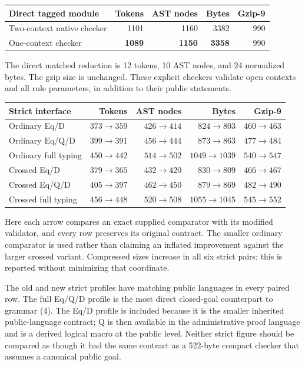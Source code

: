 \documentclass[11pt,letterpaper]{article}
\theoremstyle{definition}\newtheorem{definition}[theorem]{Definition}
\theoremstyle{remark}\newtheorem{remark}[theorem]{Remark}
\begin{document}
\begin{center}
\small
\begin{tabular}{@{}lrrrr@{}}
\toprule
Direct tagged module & Tokens & AST nodes & Bytes & Gzip-9\\
\midrule
Two-context native checker & 1101 & 1160 & 3382 & 990\\
One-context checker & \textbf{1089} & \textbf{1150} & \textbf{3358} & 990\\
\bottomrule
\end{tabular}
\end{center}
The direct matched reduction is 12 tokens, 10 AST nodes, and 24 normalized
bytes. The gzip size is unchanged. These explicit checkers validate open
contexts and all rule parameters, in addition to their public statements.

\begin{center}
\small
\begin{tabular}{@{}lrrrr@{}}
\toprule
Strict interface & Tokens & AST nodes & Bytes & Gzip-9\\
\midrule
Ordinary Eq/D & $373\to359$ & $426\to414$ & $824\to803$ & $460\to463$\\
Ordinary Eq/Q/D & $399\to391$ & $456\to444$ & $873\to863$ & $477\to484$\\
Ordinary full typing & $450\to442$ & $514\to502$ & $1049\to1039$ & $540\to547$\\
Crossed Eq/D & $379\to365$ & $432\to420$ & $830\to809$ & $466\to467$\\
Crossed Eq/Q/D & $405\to397$ & $462\to450$ & $879\to869$ & $482\to490$\\
Crossed full typing & $456\to448$ & $520\to508$ & $1055\to1045$ & $545\to552$\\
\bottomrule
\end{tabular}
\end{center}
Here each arrow compares an exact supplied comparator with its modified
validator, and every row preserves its original contract. The smaller
ordinary comparator is used rather than claiming an inflated improvement
against the larger crossed variant. Compressed sizes increase in all six
strict pairs; this is reported without minimizing that coordinate.


The old and new strict profiles have matching public languages in every
paired row. The full Eq/Q/D profile is the most direct closed-goal
counterpart to grammar (4). The Eq/D profile is included because it is
the smaller inherited public-language contract; Q is then available in
the administrative proof language and is a derived logical macro at the
public level. Neither strict figure should be compared as though it
had the same contract as a 522-byte compact checker that assumes a
canonical public goal.
\end{document}
